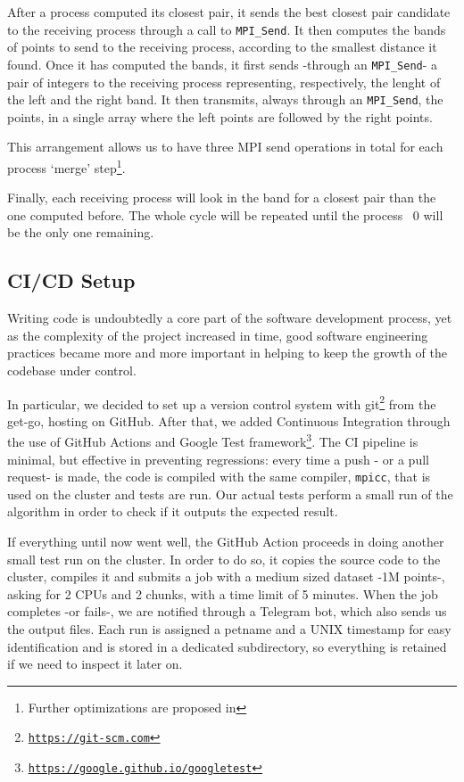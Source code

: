 After a process computed its closest pair, it sends the best closest pair candidate to the receiving process through a call to \verb|MPI_Send|. It then computes the bands of points to send to the receiving process, according to the smallest distance it found. Once it has computed the bands, it first sends -through an \verb|MPI_Send|- a pair of integers to the receiving process representing, respectively, the lenght of the left and the right band. It then transmits, always through an \verb|MPI_Send|, the points, in a single array where the left points are followed by the right points.

\noindent
This arrangement allows us to have three MPI send operations in total for each process `merge' step\footnote{Further optimizations are proposed in }.

\noindent
Finally, each receiving process will look in the band for a closest pair than the one computed before.
The whole cycle will be repeated until the process \textnumero~0 will be the only one remaining.

\subsection{CI/CD Setup}

Writing code is undoubtedly a core part of the software development process, yet as the complexity of the project increased in time, good software engineering practices became more and more important in helping to keep the growth of the codebase under control.

In particular, we decided to set up a version control system with git\footnote{\texttt{\url{https://git-scm.com}}} from the get-go, hosting on GitHub. After that, we added Continuous Integration through the use of GitHub Actions and Google Test framework\footnote{\texttt{\url{https://google.github.io/googletest}}}. The CI pipeline is minimal, but effective in preventing regressions: every time a push - or a pull request- is made, the code is compiled with the same compiler, \verb|mpicc|, that is used on the cluster and tests are run. Our actual tests perform a small run of the algorithm in order to check if it outputs the expected result.

If everything until now went well, the GitHub Action proceeds in doing another small test run on the cluster. In order to do so, it copies the source code to the cluster, compiles it and submits a job with a medium sized dataset -1M \mbox{points-,} asking for 2 CPUs and 2 chunks, with a time limit of 5 minutes. When the job completes -or fails-, we are notified through a Telegram bot, which also sends us the output files.
Each run is assigned a petname \cite{ferdous2009petnames} and a UNIX timestamp for easy identification and is stored in a dedicated subdirectory, so everything is retained if we need to inspect it later on.

